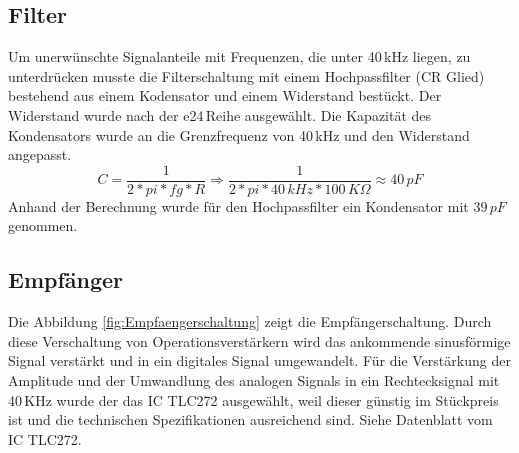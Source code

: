 \subsection{Filter}%
Um unerwünschte Signalanteile mit Frequenzen, die unter 40\,kHz liegen, zu unterdrücken musste die Filterschaltung mit einem Hochpassfilter (CR Glied) bestehend aus einem Kodensator und einem Widerstand bestückt. Der Widerstand wurde nach der e24\,Reihe ausgewählt.
Die Kapazität des Kondensators wurde an die Grenzfrequenz von 40\,kHz und den Widerstand angepasst.
\onehalfspacing \\
\[\displaystyle C=\frac{1}{2*pi*fg*R}\Rightarrow\frac{1}{2*pi*40\,kHz*100\,K\Omega}\approx40\,pF \]
\singlespacing
Anhand der Berechnung wurde für den Hochpassfilter ein Kondensator mit \(\displaystyle 39\,pF\) genommen.

\subsection{Empfänger}
Die Abbildung \ref{fig:Empfaengerschaltung} zeigt die Empfängerschaltung. Durch diese Verschaltung von Operationsverstärkern wird das ankommende sinusförmige Signal verstärkt und in ein digitales Signal umgewandelt. Für die Verstärkung der Amplitude und der Umwandlung des analogen Signals in ein Rechtecksignal mit 40\,KHz wurde der das IC TLC272 ausgewählt, weil dieser günstig im Stückpreis ist und die technischen Spezifikationen ausreichend sind. Siehe Datenblatt vom IC TLC272.\\

